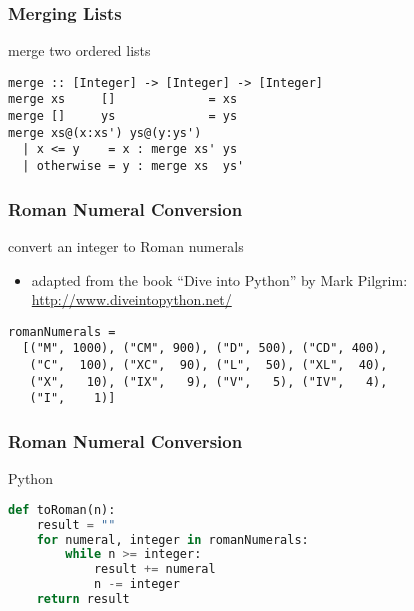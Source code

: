 \documentclass[dvipsnames]{beamer}
\theoremstyle{plain}
\begin{document}
\begin{frame}[fragile]
  \frametitle{Merging Lists}

  \begin{exampleblock}{merge two ordered lists}
    \begin{lstlisting}
merge :: [Integer] -> [Integer] -> [Integer]
merge xs     []             = xs
merge []     ys             = ys
merge xs@(x:xs') ys@(y:ys')
  | x <= y    = x : merge xs' ys
  | otherwise = y : merge xs  ys'
    \end{lstlisting}
  \end{exampleblock}
\end{frame}

\begin{frame}[fragile]
  \frametitle{Roman Numeral Conversion}


  \begin{exampleblock}{convert an integer to Roman numerals}
    \begin{itemize}
      \item adapted from the book ``Dive into Python'' by Mark Pilgrim:\\
        \url{http://www.diveintopython.net/}
    \end{itemize}

    \medskip
    \begin{lstlisting}
romanNumerals =
  [("M", 1000), ("CM", 900), ("D", 500), ("CD", 400),
   ("C",  100), ("XC",  90), ("L",  50), ("XL",  40),
   ("X",   10), ("IX",   9), ("V",   5), ("IV",   4),
   ("I",    1)]
    \end{lstlisting}
  \end{exampleblock}
\end{frame}

\begin{frame}[fragile]
  \frametitle{Roman Numeral Conversion}

  \begin{exampleblock}{Python}
    \begin{lstlisting}[language=python]
def toRoman(n):
    result = ""
    for numeral, integer in romanNumerals:
        while n >= integer:
            result += numeral
            n -= integer
    return result
    \end{lstlisting}
  \end{exampleblock}
\end{frame}
\end{document}
